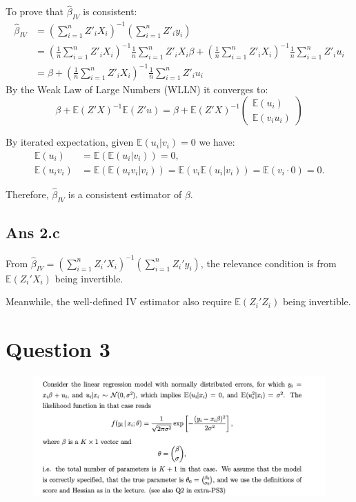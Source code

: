 \documentclass{article}
\begin{document}
To prove that \( \hat{\beta}_{IV} \) is consistent:
\begin{align*}
\hat{\beta}_{IV} &= \left( \sum_{i=1}^{n} Z'_i X_i \right)^{-1} \left( \sum_{i=1}^{n} Z'_i y_i \right)\\
&= \left( \frac{1}{n} \sum_{i=1}^{n} Z'_i X_i \right)^{-1} \frac{1}{n} \sum_{i=1}^{n} Z'_i X_i \beta + \left( \frac{1}{n} \sum_{i=1}^{n} Z'_i X_i \right)^{-1} \frac{1}{n} \sum_{i=1}^{n} Z'_i u_i\\
&= \beta + \left( \frac{1}{n} \sum_{i=1}^{n} Z'_i X_i \right)^{-1} \frac{1}{n} \sum_{i=1}^{n} Z'_i u_i
\end{align*}
By the Weak Law of Large Numbers (WLLN) it converges to: 
\[
\beta + \mathbb{E}(Z'X)^{-1} \mathbb{E}(Z'u) = \beta + \mathbb{E}(Z'X)^{-1} \begin{pmatrix} \mathbb{E}(u_i) \\ \mathbb{E}(v_i u_i) \end{pmatrix}
\]

By iterated expectation, given \(\mathbb{E}(u_i|v_i) = 0\) we have:
\begin{align*}
\mathbb{E}(u_i) &= \mathbb{E}(\mathbb{E}(u_i|v_i)) = 0, \\
\mathbb{E}(u_i v_i) &= \mathbb{E}(\mathbb{E}(u_i v_i|v_i)) = \mathbb{E}(v_i \mathbb{E}(u_i|v_i)) = \mathbb{E}(v_i \cdot 0) = 0.
\end{align*}


Therefore, \( \hat{\beta}_{IV} \) is a consistent estimator of \( \beta \).

\subsection*{Ans 2.c }
From \( \hat{\beta}_{IV} = \left( \sum_{i=1}^{n} Z_i'X_i \right)^{-1} \left( \sum_{i=1}^{n} Z_i'y_i \right) \), the relevance condition is from \( \mathbb{E}(Z_i'X_i) \) being invertible.

Meanwhile, the well-defined IV estimator also require \( \mathbb{E}(Z_i'Z_i) \) being invertible.

\section*{Question 3}
\begin{figure}[!htbp]
    \centering
    \includegraphics[width=1\linewidth]{question 3.png}
\end{figure}
\end{document}
